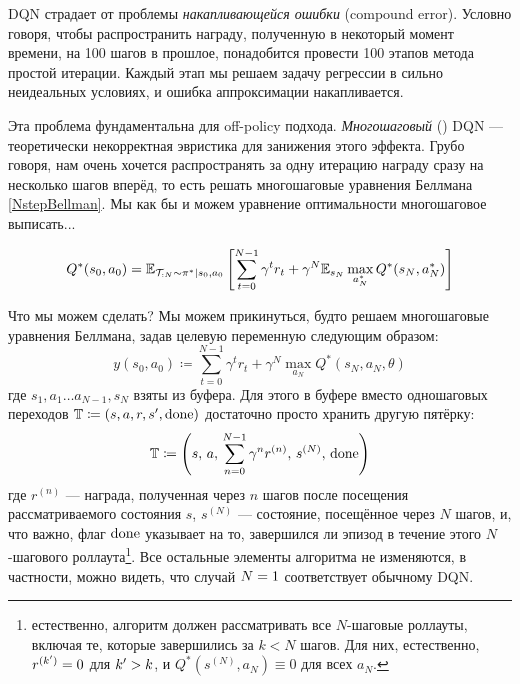 DQN страдает от проблемы \emph{накапливающейся ошибки} (compound error). Условно говоря, чтобы распространить награду, полученную в некоторый момент времени, на 100 шагов в прошлое, понадобится провести 100 этапов метода простой итерации. Каждый этап мы решаем задачу регрессии в сильно неидеальных условиях, и ошибка аппроксимации накапливается.

Эта проблема фундаментальна для off-policy подхода. \emph{Многошаговый} () DQN --- теоретически некорректная эвристика для занижения этого эффекта. Грубо говоря, нам очень хочется распространять за одну итерацию награду сразу на несколько шагов вперёд, то есть решать многошаговые уравнения Беллмана \eqref{NstepBellman}. Мы как бы и можем уравнение оптимальности многошаговое выписать...

\begin{proposition}
\begin{equation}\label{NstepOptimBellman}
 Q^*(s_0, a_0) = \mathbb{E}_{\mathcal{T}_{:N} \sim \pi^* \mid s_0, a_0} \left[ \sum_{t=0}^{N-1} \gamma^{t}r_t + \gamma^N \mathbb{E}_{s_N} \max_{a^*_N} Q^*(s_N, a^*_N) \right]   
\end{equation}
\end{proposition}

Что мы можем сделать? Мы можем прикинуться, будто решаем многошаговые уравнения Беллмана, задав целевую переменную следующим образом:
\begin{equation}\label{Nsteptarget}
y(s_0, a_0) \coloneqq \sum_{t=0}^{N-1} \gamma^{t}r_t + \gamma^N \max_{a_N} Q^*(s_N, a_N, \theta)
\end{equation}
где $s_1, a_1 \dots a_{N-1}, s_N$ взяты из буфера. Для этого в буфере вместо одношаговых переходов $\mathbb{T} \coloneqq (s, a, r, s', \mathrm{done})$ достаточно просто хранить другую пятёрку:
$$\mathbb{T} \coloneqq \left( s, \, a, \, \sum_{n=0}^{N-1} \gamma^{n}r^{(n)}, \, s^{(N)}, \, \mathrm{done} \right)$$
где $r^{(n)}$ --- награда, полученная через $n$ шагов после посещения рассматриваемого состояния $s$, $s^{(N)}$ --- состояние, посещённое через $N$ шагов, и, что важно, флаг $\mathrm{done}$ указывает на то, завершился ли эпизод в течение этого $N$-шагового роллаута\footnote{естественно, алгоритм должен рассматривать все $N$-шаговые роллауты, включая те, которые завершились за $k < N$ шагов. Для них, естественно, $r^{(k')} \HM= 0$ для $k' \HM> k$, и $Q^*(s^{(N)}, a_N) \equiv 0$ для всех $a_N$.}. Все остальные элементы алгоритма не изменяются, в частности, можно видеть, что случай $N \HM= 1$ соответствует обычному DQN.

